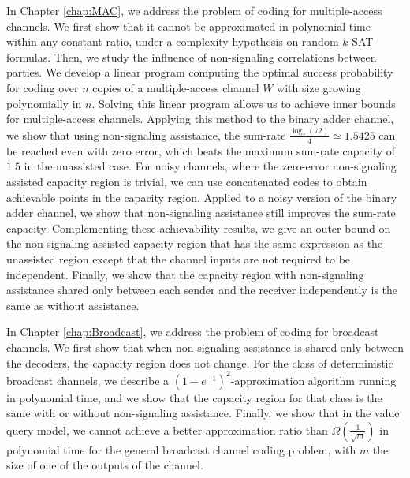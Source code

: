 In Chapter \ref{chap:MAC}, we address the problem of coding for multiple-access channels. We first show that it cannot be approximated in polynomial time within any constant ratio, under a complexity hypothesis on random $k$-SAT formulas. Then, we study the influence of non-signaling correlations between parties. We develop a linear program computing the optimal success probability for coding over $n$ copies of a multiple-access channel $W$ with size growing polynomially in $n$. Solving this linear program allows us to achieve inner bounds for multiple-access channels. Applying this method to the binary adder channel, we show that using non-signaling assistance, the sum-rate $\frac{\log_2(72)}{4} \simeq 1.5425$ can be reached even with zero error, which beats the maximum sum-rate capacity of $1.5$ in the unassisted case. For noisy channels, where the zero-error non-signaling assisted capacity region is trivial, we can use concatenated codes to obtain achievable points in the capacity region. Applied to a noisy version of the binary adder channel, we show that non-signaling assistance still improves the sum-rate capacity. Complementing these achievability results, we give an outer bound on the non-signaling assisted capacity region that has the same expression as the unassisted region except that the channel inputs are not required to be independent. Finally, we show that the capacity region with non-signaling assistance shared only between each sender and the receiver independently is the same as without assistance.

In Chapter \ref{chap:Broadcast}, we address the problem of coding for broadcast channels. We first show that when non-signaling assistance is shared only between the decoders, the capacity region does not change. For the class of deterministic broadcast channels, we describe a $(1-e^{-1})^2$-approximation algorithm running in polynomial time, and we show that the capacity region for that class is the same with or without non-signaling assistance. Finally, we show that in the value query model, we cannot achieve a better approximation ratio than $\Omega\left(\frac{1}{\sqrt{m}}\right)$ in polynomial time for the general broadcast channel coding problem, with $m$ the size of one of the outputs of the channel.
